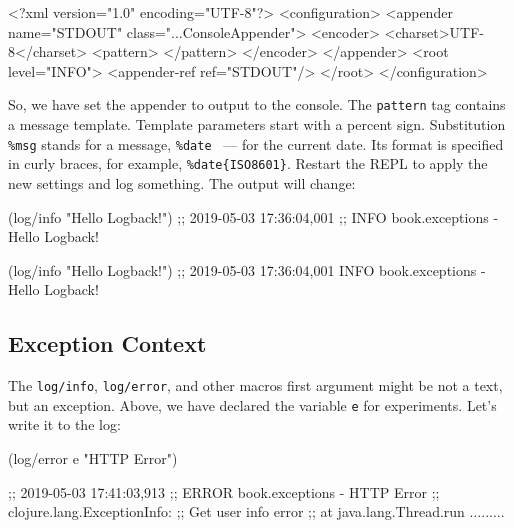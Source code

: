 \else

\begin{english}
  \begin{xml}
<?xml version="1.0" encoding="UTF-8"?>
<configuration>
  <appender name="STDOUT" class="...ConsoleAppender">
    <encoder>
      <charset>UTF-8</charset>
      <pattern>
      </pattern>
    </encoder>
  </appender>
  <root level="INFO">
    <appender-ref ref="STDOUT"/>
  </root>
</configuration>
  \end{xml}
\end{english}

\fi


So, we have set the appender to output to the console. The \verb|pattern| tag contains a message template. Template parameters start with a percent sign. Substitution \verb|%msg| stands for a message, \verb|%date| ~--- for the current date. Its format is specified in curly braces, for example, \verb|%date{ISO8601}|. Restart the REPL to apply the new settings and log something. The output will change:

\ifnarrow

\begin{clojure}
(log/info "Hello Logback!")
;; 2019-05-03 17:36:04,001
;; INFO book.exceptions - Hello Logback!
\end{clojure}

\else

\begin{clojure}
(log/info "Hello Logback!")
;; 2019-05-03 17:36:04,001 INFO book.exceptions - Hello Logback!
\end{clojure}

\fi

\subsection{Exception Context}

\label{log-ex-param}

The \verb|log/info|, \verb|log/error|, and other macros first argument might be not a text, but an exception. Above, we have declared the variable \verb|e| for experiments. Let's write it to the log:

\ifnarrow

\begin{clojure}
(log/error e "HTTP Error")

;; 2019-05-03 17:41:03,913
;; ERROR book.exceptions - HTTP Error
;; clojure.lang.ExceptionInfo:
;; Get user info error
;; at java.lang.Thread.run .........
\end{clojure}

